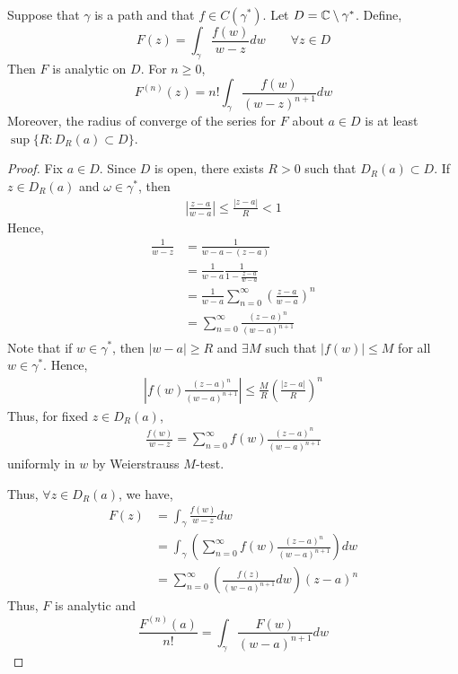 \documentclass[12pt]{amsart}
\begin{document}
\begin{theorem}[W 3.31]
    Suppose that $\gamma$ is a path and that $f \in C(\gamma^*)$. Let $D = \mathbb C \setminus \gamma^*$. Define, 
    \[ F(z) = \int_\gamma \frac{f(w)}{w-z}dw \qquad \forall z \in D\]
    Then $F$ is analytic on $D$. For $n \geq 0$, 
    \[ F^{(n)}(z) = n! \int_\gamma \frac{f(w)}{(w-z)^{n+1}}dw\]
    Moreover, the radius of converge of the series for $F$ about $a \in D$ is at least $\sup\{R : D_R(a) \subset D\}$. 
\end{theorem}
\begin{proof}
    Fix $a \in D$. Since $D$ is open, there exists $R > 0$ such that $D_R(a) \subset D$. If $z \in D_R(a)$ and $\omega \in \gamma^*$, then 
    \begin{align*}
        \left|\frac{z-a}{w-a}\right| \leq \frac{|z-a|}{R} < 1
    \end{align*}
    Hence, 
    \begin{align*}
        \frac{1}{w-z} &= \frac{1}{w-a -(z-a)} \\
        &= \frac{1}{w-a} \frac{1}{1-\frac{z-a}{w-a}} \\
        &= \frac{1}{w-a} \sum_{n=0}^\infty \left( \frac{z-a}{w-a}\right)^n \\
        &= \sum_{n=0}^\infty \frac{(z-a)^n}{(w-a)^{n+1}} 
    \end{align*}
    Note that if $w \in \gamma^*$, then $|w-a| \geq R$ and $\exists M$ such that $|f(w)| \leq M$ for all $w \in \gamma^*$. Hence, 
    \begin{align*}
        \left|f(w) \frac{(z-a)^n}{(w-a)^{n+1}}\right| \leq \frac{M}{R}\left(\frac{|z-a|}{R}\right)^n
    \end{align*}
    Thus, for fixed $z \in D_R(a)$, 
    \begin{align*}
        \frac{f(w)}{w-z} = \sum_{n=0}^\infty f(w)\frac{(z-a)^n}{(w-a)^{n+1}}
    \end{align*}
    uniformly in $w$ by Weierstrauss $M$-test. 

    Thus, $\forall z \in D_R(a)$, we have, 
    \begin{align*}
        F(z) &= \int_\gamma \frac{f(w)}{w-z}dw \\
        &= \int_\gamma \left(\sum_{n=0}^\infty f(w) \frac{(z-a)^n}{(w-a)^{n+1}} \right) dw \\
        &= \sum_{n=0}^\infty \left(\frac{f(z)}{(w-a)^{n+1}}dw\right)(z-a)^n
    \end{align*}
    Thus, $F$ is analytic and 
    \[ \frac{F^{(n)}(a)}{n!} = \int_\gamma \frac{F(w)}{(w-a)^{n+1}}dw\]
\end{proof}
\end{document}
